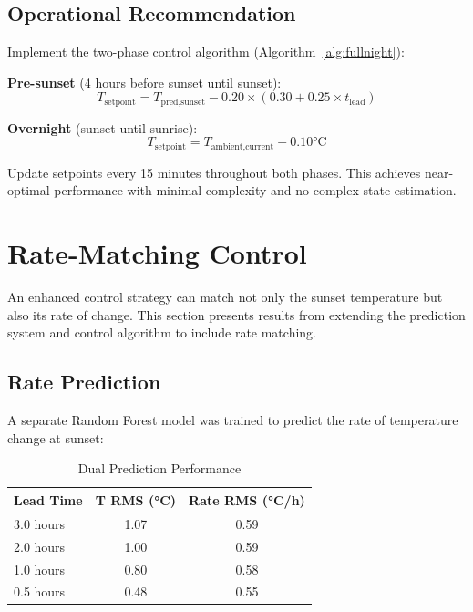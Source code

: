 \documentclass[11pt,letterpaper]{article}
\begin{document}
\subsection{Operational Recommendation}

Implement the two-phase control algorithm (Algorithm~\ref{alg:fullnight}):

\textbf{Pre-sunset} (4 hours before sunset until sunset):
\begin{equation*}
T_{\text{setpoint}} = T_{\text{pred,sunset}} - 0.20 \times (0.30 + 0.25 \times t_{\text{lead}})
\end{equation*}

\textbf{Overnight} (sunset until sunrise):
\begin{equation*}
T_{\text{setpoint}} = T_{\text{ambient,current}} - 0.10\text{°C}
\end{equation*}

Update setpoints every 15 minutes throughout both phases. This achieves near-optimal performance with minimal complexity and no complex state estimation.

\section{Rate-Matching Control}

An enhanced control strategy can match not only the sunset temperature but also its rate of change. This section presents results from extending the prediction system and control algorithm to include rate matching.

\subsection{Rate Prediction}

A separate Random Forest model was trained to predict the rate of temperature change at sunset:

\begin{table}[h]
\centering
\caption{Dual Prediction Performance}
\begin{tabular}{lcc}
\toprule
\textbf{Lead Time} & \textbf{T RMS (°C)} & \textbf{Rate RMS (°C/h)} \\
\midrule
3.0 hours & 1.07 & 0.59 \\
2.0 hours & 1.00 & 0.59 \\
1.0 hours & 0.80 & 0.58 \\
0.5 hours & 0.48 & 0.55 \\
\bottomrule
\end{tabular}
\end{table}
\end{document}

